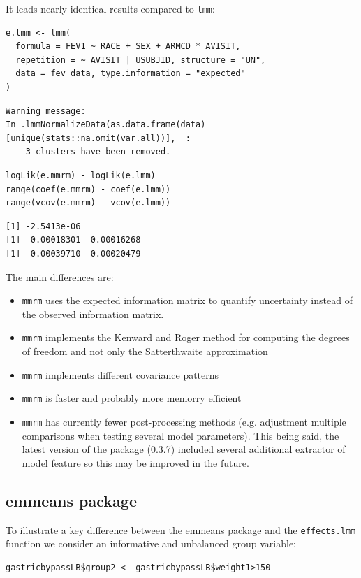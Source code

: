 \documentclass[12pt]{article}
\begin{document}
It leads nearly identical results compared to \texttt{lmm}:
\lstset{language=r,label= ,caption= ,captionpos=b,numbers=none}
\begin{lstlisting}
e.lmm <- lmm(
  formula = FEV1 ~ RACE + SEX + ARMCD * AVISIT,
  repetition = ~ AVISIT | USUBJID, structure = "UN",
  data = fev_data, type.information = "expected"
)
\end{lstlisting}
\begin{verbatim}
Warning message:
In .lmmNormalizeData(as.data.frame(data)[unique(stats::na.omit(var.all))],  :
    3 clusters have been removed.
\end{verbatim}


\lstset{language=r,label= ,caption= ,captionpos=b,numbers=none}
\begin{lstlisting}
logLik(e.mmrm) - logLik(e.lmm)
range(coef(e.mmrm) - coef(e.lmm))
range(vcov(e.mmrm) - vcov(e.lmm))
\end{lstlisting}

\begin{verbatim}
[1] -2.5413e-06
[1] -0.00018301  0.00016268
[1] -0.00039710  0.00020479
\end{verbatim}


The main differences are:
\begin{itemize}
\item \texttt{mmrm} uses the expected information matrix to quantify uncertainty
instead of the observed information matrix.
\item \texttt{mmrm} implements the Kenward and Roger method for computing the degrees of
freedom and not only the Satterthwaite approximation
\item \texttt{mmrm} implements different covariance patterns
\item \texttt{mmrm} is faster and probably more memorry efficient
\item \texttt{mmrm} has currently fewer post-processing methods (e.g. adjustment
multiple comparisons when testing several model parameters). This
being said, the latest version of the package (0.3.7) included
several additional extractor of model feature so this may be
improved in the future.
\end{itemize}

\subsection{emmeans package}
\label{sec:org39f5780}

To illustrate a key difference between the emmeans package and the
\texttt{effects.lmm} function we consider an informative and unbalanced group
variable:
\lstset{language=r,label= ,caption= ,captionpos=b,numbers=none}
\begin{lstlisting}
gastricbypassLB$group2 <- gastricbypassLB$weight1>150
\end{lstlisting}
\end{document}
